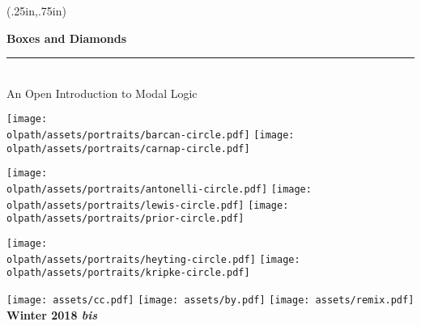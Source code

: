 
\thispagestyle{empty}

\pagecolor{ltleadbeater}
  \begin{textblock*}{4.5in}(.25in,.75in)%
    \begin{raggedright}
      \fontsize{26pt}{30pt}\selectfont\bfseries\sffamily%
      Boxes and Diamonds\\[5pt]
      \normalfont\fontsize{18pt}{0pt}\selectfont\bfseries\itshape%
      \rule{4.5in}{5pt}\\[5pt]
      An Open Introduction to Modal Logic

\vskip1.5cm

\hfill\texttt{[image: \\olpath/assets/portraits/barcan-circle.pdf]}
\texttt{[image: \\olpath/assets/portraits/carnap-circle.pdf]}\hfill{}

\texttt{[image: \\olpath/assets/portraits/antonelli-circle.pdf]}\hfill
\texttt{[image: \\olpath/assets/portraits/lewis-circle.pdf]}\hfill
\texttt{[image: \\olpath/assets/portraits/prior-circle.pdf]}

\hfill\texttt{[image: \\olpath/assets/portraits/heyting-circle.pdf]}
\texttt{[image: \\olpath/assets/portraits/kripke-circle.pdf]}\hfill{}

\vskip1.5cm

\texttt{[image: assets/cc.pdf]}
\texttt{[image: assets/by.pdf]}
\texttt{[image: assets/remix.pdf]}
\normalfont\fontsize{16pt}{0pt}\selectfont\bfseries\sffamily%
\hfill Winter 2018 \emph{bis}
    \end{raggedright}   
\end{textblock*}
\

\clearpage
\setcounter{page}{1}
\nopagecolor


